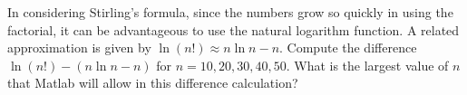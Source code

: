 {In considering Stirling's formula, since the numbers grow so quickly in using the factorial, it can be advantageous to use the natural logarithm function.  A related approximation is given by $\ln (n!) \approx n \ln n - n$.  Compute the difference $\ln (n!) -( n \ln n - n)$ for $n = 10, 20, 30, 40, 50$.  What is the largest value of $n$ that Matlab will allow in this difference calculation?}
{}
